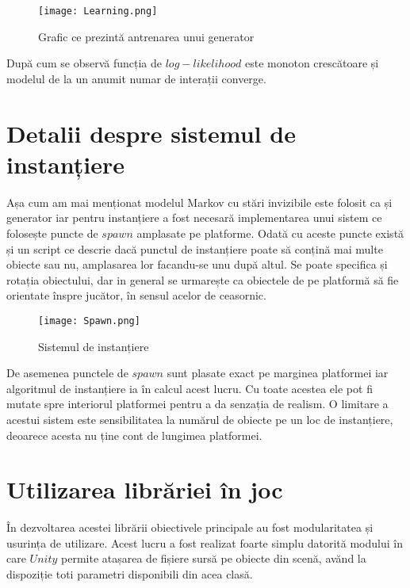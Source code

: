\vspace{10mm}
\begin{figure}[H]
\centering
\texttt{[image: Learning.png]} \par
\caption{Grafic ce prezintă antrenarea unui generator}
\end{figure}

După cum se observă funcția de $log-likelihood$ este monoton crescătoare și modelul de la un anumit numar de interații converge.\par

\section{Detalii despre sistemul de instanțiere}

Așa cum am mai menționat modelul Markov cu stări invizibile este folosit ca și generator iar pentru instanțiere a fost necesară implementarea unui sistem ce folosește puncte de $spawn$ amplasate pe platforme. Odată cu aceste puncte există și un script ce descrie dacă punctul de instanțiere poate să conțină mai multe obiecte sau nu, amplasarea lor facandu-se unu după altul. Se poate specifica și rotația obiectului, dar in general se urmarește ca obiectele de pe platformă să fie orientate înspre jucător, în sensul acelor de ceasornic.\par

\vspace{10mm}
\begin{figure}[H]
\centering
\texttt{[image: Spawn.png]} \par
\caption{Sistemul de instanțiere}
\end{figure}

De asemenea punctele de $spawn$ sunt plasate exact pe marginea platformei iar algoritmul de instanțiere ia în calcul acest lucru. Cu toate acestea ele pot fi mutate spre interiorul platformei pentru a da senzația de realism. O limitare a acestui sistem este sensibilitatea la numărul de obiecte pe un loc de instanțiere, deoarece acesta nu ține cont de lungimea platformei.\par

\section{Utilizarea librăriei în joc}

În dezvoltarea acestei librării obiectivele principale au fost modularitatea și usurința de utilizare. Acest lucru a fost realizat foarte simplu datorită modului în care $Unity$ permite atașarea de fișiere sursă pe obiecte din scenă, avănd la dispoziție toti parametri disponibili din acea clasă.\par

